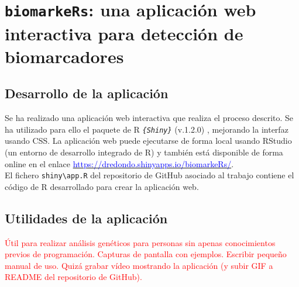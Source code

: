 \chapter{\texttt{biomarkeRs}: una aplicación web interactiva para detección de biomarcadores}

\section{Desarrollo de la aplicación}

Se ha realizado una aplicación web interactiva que realiza el proceso descrito. Se ha utilizado para ello el paquete de R \textit{\texttt{\{Shiny\}}} (v.1.2.0) \cite{Chang2020}, mejorando la interfaz usando CSS. La aplicación web puede ejecutarse de forma local usando RStudio (un entorno de desarrollo integrado de R) \cite{RStudioTeam2020} y también está disponible de forma online en el enlace \href{https://dredondo.shinyapps.io/biomarkeRs/}{\textcolor{blue}{https://dredondo.shinyapps.io/biomarkeRs/}}.\\

El fichero \texttt{shiny\textbackslash app.R} del repositorio de GitHub asociado al trabajo \cite{Redondo-Sanchez2020}  contiene el código de R desarrollado para crear la aplicación web.\\

\section{Utilidades de la aplicación}

\textcolor{red}{Útil para realizar análisis genéticos para personas sin apenas conocimientos previos de programación. Capturas de pantalla con ejemplos. Escribir pequeño manual de uso. Quizá grabar vídeo mostrando la aplicación (y subir GIF a README del repositorio de GitHub).}